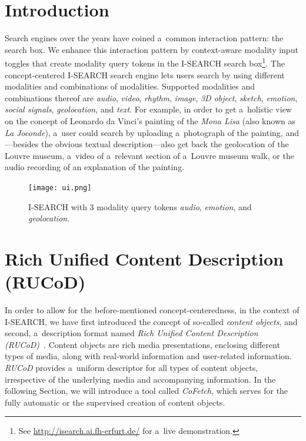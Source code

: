 \documentclass[runningheads,a4paper]{llncs}
\begin{document}
\section{Introduction}
Search engines over the years have coined a~common interaction pattern:
the search box.
We enhance this interaction pattern by context-aware modality input toggles
that create modality query tokens in the \mbox{I-SEARCH} search
box\footnote{See \url{http://isearch.ai.fh-erfurt.de/} for a~live demonstration.}.
The concept-centered \mbox{I-SEARCH} search engine lets users search
by using different modalities and combinations of modalities.
Supported modalities and combinations thereof are \emph{audio}, \emph{video},
\emph{rhythm}, \emph{image}, \emph{3D object}, \emph{sketch}, \emph{emotion},
\emph{social signals}, \emph{geolocation}, and \emph{text}.
For example, in order to get a~holistic view on the concept of
Leonardo da Vinci's painting of the \emph{Mona Lisa} (also known as \emph{La Joconde}),
a~user could search by uploading a~photograph of the painting,
and---besides the obvious textual description---also get back
the geolocation of the Louvre museum,
a~video of a~relevant section of a~Louvre museum walk,
or the audio recording of an explanation of the painting.

\begin{figure}
\texttt{[image: ui.png]}
\caption{\mbox{I-SEARCH} with 3 modality query tokens \emph{audio}, \emph{emotion}, and \emph{geolocation}.}
\label{fig:ui}
\end{figure}


\section{Rich Unified Content Description (RUCoD)}
In order to allow for the before-mentioned concept-centeredness,
in the context of \mbox{I-SEARCH}, we have first introduced
the concept of so-called \emph{content objects}, and second,
a~description format named \emph{Rich Unified Content Description
\mbox{(RUCoD)}}~\cite{ijmis2010}.
Content objects are rich media presentations, enclosing different types of media,
along with real-world information and user-related information.
\mbox{\emph{RUCoD}} provides a~uniform descriptor for all types of content objects,
irrespective of the underlying media and accompanying information.
In the following Section, we will introduce a tool called \mbox{\emph{CoFetch}},
which serves for the fully automatic or the supervised creation of content objects.
\end{document}
